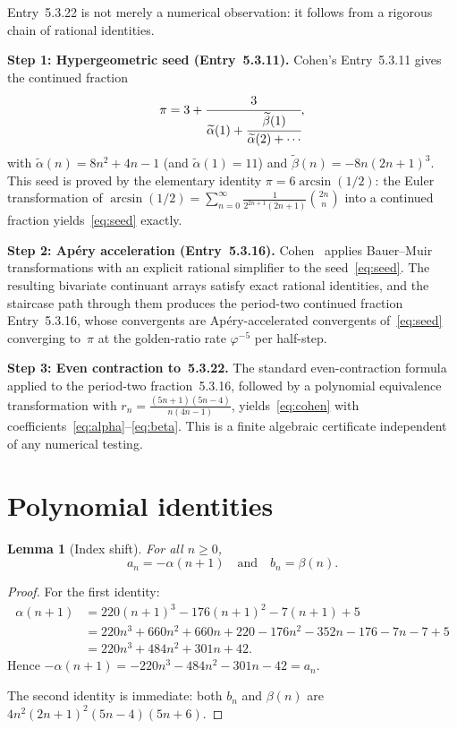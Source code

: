\documentclass[11pt]{article}
\newtheorem{lemma}[theorem]{Lemma}
\begin{document}
Entry~5.3.22 is not merely a numerical observation: it follows
from a rigorous chain of rational identities.

\medskip\noindent
\textbf{Step 1: Hypergeometric seed (Entry~5.3.11).}
Cohen's Entry~5.3.11 gives the continued fraction
\begin{equation}\label{eq:seed}
\pi = 3 + \cfrac{3}{\widetilde\alpha(1) + \cfrac{\widetilde\beta(1)}{
\widetilde\alpha(2) + \cdots}},
\end{equation}
with $\widetilde\alpha(n) = 8n^2+4n-1$ (and $\widetilde\alpha(1)=11$)
and $\widetilde\beta(n) = -8n(2n+1)^3$.
This seed is proved by the elementary identity
$\pi = 6\arcsin(1/2)$: the Euler transformation of
$\arcsin(1/2) = \sum_{n=0}^{\infty}
\frac{1}{2^{2n+1}(2n+1)}\binom{2n}{n}$
into a continued fraction yields~\eqref{eq:seed} exactly.

\medskip\noindent
\textbf{Step 2: Ap\'ery acceleration (Entry~5.3.16).}
Cohen~\cite{Cohen2024paper} applies Bauer--Muir transformations
with an explicit rational simplifier to the seed~\eqref{eq:seed}.
The resulting bivariate continuant arrays satisfy exact rational
identities, and the staircase path through them produces the
period-two continued fraction Entry~5.3.16, whose convergents
are Ap\'ery-accelerated convergents of~\eqref{eq:seed} converging
to~$\pi$ at the golden-ratio rate $\varphi^{-5}$ per half-step.

\medskip\noindent
\textbf{Step 3: Even contraction to~5.3.22.}
The standard even-contraction formula applied to the period-two
fraction~5.3.16, followed by a polynomial equivalence
transformation with $r_n = \frac{(5n+1)(5n-4)}{n(4n-1)}$,
yields~\eqref{eq:cohen} with coefficients~\eqref{eq:alpha}--\eqref{eq:beta}.
This is a finite algebraic certificate independent of any
numerical testing.

\section{Polynomial identities}

\begin{lemma}[Index shift]\label{lem:shift}
For all $n \ge 0$,
\[
a_n = -\alpha(n+1) \quad\text{and}\quad b_n = \beta(n).
\]
\end{lemma}

\begin{proof}
For the first identity:
\begin{align*}
\alpha(n+1) &= 220(n+1)^3 - 176(n+1)^2 - 7(n+1) + 5 \\
&= 220n^3 + 660n^2 + 660n + 220 - 176n^2 - 352n - 176 - 7n - 7 + 5 \\
&= 220n^3 + 484n^2 + 301n + 42.
\end{align*}
Hence $-\alpha(n+1) = -220n^3 - 484n^2 - 301n - 42 = a_n$.

The second identity is immediate: both $b_n$ and $\beta(n)$ are
$4n^2(2n+1)^2(5n-4)(5n+6)$. \qedhere
\end{proof}
\end{document}
